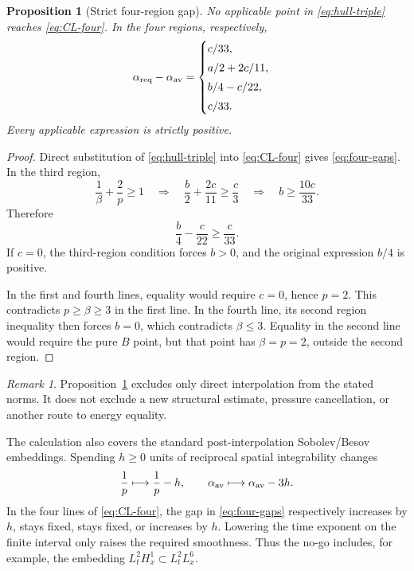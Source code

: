 \documentclass[11pt]{article}
\newtheorem{proposition}[theorem]{Proposition}
\theoremstyle{remark}
\newtheorem{remark}[theorem]{Remark}
\begin{document}
\begin{proposition}[Strict four-region gap]
\label{prop:CL-gap}
No applicable point in \eqref{eq:hull-triple} reaches
\eqref{eq:CL-four}.  In the four regions, respectively,
\begin{equation}
 \label{eq:four-gaps}
 \alpha_{\rm req}-\alpha_{\rm av}
 =
 \begin{cases}
 c/33,\\[1mm]
 a/2+2c/11,\\[1mm]
 b/4-c/22,\\[1mm]
 c/33.
 \end{cases}
\end{equation}
Every applicable expression is strictly positive.
\end{proposition}

\begin{proof}
Direct substitution of \eqref{eq:hull-triple} into
\eqref{eq:CL-four} gives \eqref{eq:four-gaps}.
In the third region,
\[
 \frac1\beta+\frac2p\geq1
 \quad\Longrightarrow\quad
 \frac b2+\frac{2c}{11}\geq\frac c3
 \quad\Longrightarrow\quad
 b\geq\frac{10c}{33}.
\]
Therefore
\[
 \frac b4-\frac c{22}\geq\frac c{33}.
\]
If \(c=0\), the third-region condition forces \(b>0\), and the
original expression \(b/4\) is positive.

In the first and fourth lines, equality would require \(c=0\), hence
\(p=2\).  This contradicts \(p\geq\beta\geq3\) in the first line.  In
the fourth line, its second region inequality then forces \(b=0\),
which contradicts \(\beta\leq3\).  Equality in the second line would
require the pure \(B\) point, but that point has \(\beta=p=2\), outside
the second region.
\end{proof}

\begin{remark}
Proposition~\ref{prop:CL-gap} excludes only direct interpolation from
the stated norms.  It does not exclude a new structural estimate,
pressure cancellation, or another route to energy equality.

The calculation also covers the standard post-interpolation
Sobolev/Besov embeddings.  Spending \(h\geq0\) units of reciprocal
spatial integrability changes
\[
 \frac1p\longmapsto\frac1p-h,
 \qquad
 \alpha_{\rm av}\longmapsto\alpha_{\rm av}-3h.
\]
In the four lines of \eqref{eq:CL-four}, the gap in
\eqref{eq:four-gaps} respectively increases by \(h\), stays fixed,
stays fixed, or increases by \(h\).  Lowering the time exponent on the
finite interval only raises the required smoothness.  Thus the no-go
includes, for example, the embedding
\(L_t^2H_x^1\subset L_t^2L_x^6\).
\end{remark}
\end{document}

